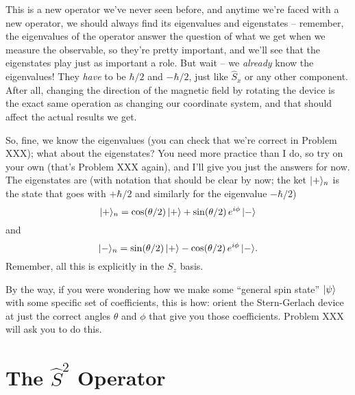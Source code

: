 This is a new operator we've never seen before, and anytime we're faced with a new operator, we should always find its eigenvalues and eigenstates -- remember, the eigenvalues of the operator answer the question of what we get when we measure the observable, so they're pretty important, and we'll see that the eigenstates play just as important a role.  But wait -- we \emph{already} know the eigenvalues!  They \emph{have} to be $\hbar/2$ and $-\hbar/2$, just like $\hat{S}_x$ or any other component.  After all, changing the direction of the magnetic field by rotating the device is the exact same operation as changing our coordinate system, and that should affect the actual results we get.

So, fine, we know the eigenvalues (you can check that we're correct in Problem XXX); what about the eigenstates?  You need more practice than I do, so try on your own (that's Problem XXX again), and I'll give you just the answers for now.  The eigenstates are (with notation that should be clear by now; the ket $| + \rangle_n$ is the state that goes with $+\hbar/2$ and similarly for the eigenvalue $-\hbar/2$)
\begin{equation}
| + \rangle_n = \cos (\theta/2) \, | + \rangle + \sin (\theta/2) \, e^{i\phi} \, | - \rangle
\end{equation}
and
\begin{equation}
| - \rangle_n = \sin (\theta/2) \, | + \rangle - \cos (\theta/2) \, e^{i\phi} \, | - \rangle.
\end{equation}
Remember, all this is explicitly in the $S_z$ basis.

By the way, if you were wondering how we make some ``general spin state'' $| \psi \rangle$ with some specific set of coefficients, this is how:  orient the Stern-Gerlach device at just the correct angles $\theta$ and $\phi$ that give you those coefficients.  Problem XXX will ask you to do this.


\section{The $\hat{S}^2$ Operator}

